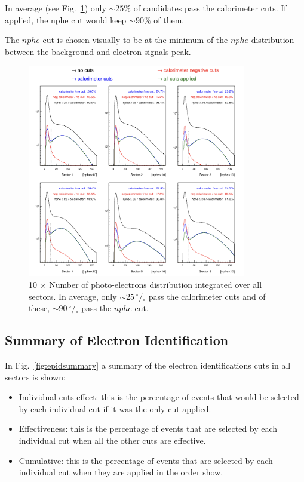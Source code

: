 In average (see Fig.~\ref{fig:cccut_alls}) only $\sim 25\%$ of candidates pass the calorimeter cuts. 
If applied, the nphe cut would keep $\sim 90\%$ of them.

The $nphe$ cut is chosen visually to be at the minimum
of the $nphe$ distribution between the background and electron signals peak.


\begin{figure}[ht]
  \centering
		\includegraphics[width=0.85\textwidth ]{img/cut-12nphe_sector-all.png}
		\caption{10 $\times$ Number of photo-electrons distribution integrated over all sectors.
               In average, only $\sim 25 \,^{\circ\!\!}/\!_\circ$ pass the calorimeter cuts and of these, 
               $\sim 90 \,^{\circ\!\!}/\!_\circ$ pass the $nphe$ cut.}
 		\label{fig:cccut_alls}
\end{figure}
		




\subsection{Summary of Electron Identification }
In Fig.~\ref{fig:epidsummary} a summary of the electron identifications cuts in all sectors is shown:

\begin{itemize}
	\item Individual cuts effect: this is the percentage of events that would be selected by each
	individual cut if it was the only cut applied.
	\item Effectiveness: this is the percentage of events that are selected by each individual cut when
	all the other cuts are effective.
	\item Cumulative: this is the percentage of events that are selected by each individual cut when
	they are applied in the order show.
\end{itemize}


